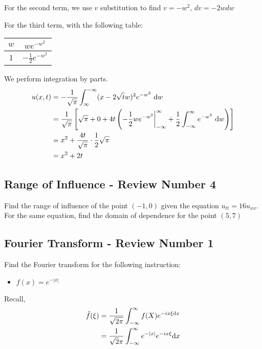 For the second term, we use $v$ substitution to find $v = -w^2$, $dv = -2w dw$

For the third term, with the following table:
%
\begin{center}
  \begin{tabular}{c|c}
    $w$ & $we^{-w^2}$\\
    \hline
    $1$ & $-\frac{1}{2} e^{-w^2}$
  \end{tabular}
\end{center}

We perform integration by parts.
%
\begin{align}
  u(x, t) & = - \frac{1}{\sqrt \pi} \int^{-\infty}_{\infty} (x - 2 \sqrt t w)^2 e^{-w^2}\ \text dw\\
  & = \frac{1}{\sqrt \pi}
  \left[
  \sqrt \pi
  + 0
  + 4t
  \left(
  -\frac{1}{2} we^{-w^2} \bigg|^\infty_{-\infty} + \frac{1}{2} \int^\infty_{-\infty} e^{-w^2}\ \text dw
  \right)
  \right]\\
  & = x^2 + \frac{4t}{\sqrt \pi} \cdot \frac{1}{2} \sqrt \pi\\
  & = x^2 + 2t
\end{align}

\subsection*{Range of Influence - Review Number 4}

Find the range of influence of the point $(-1, 0)$ given the equation $u_{tt} = 16u_{xx}$. For the same equation, find the domain of dependence for the point $(5, 7)$

\subsection*{Fourier Transform - Review Number 1}

Find the Fourier transform for the following instruction:
%
\begin{itemize}
  \item $f(x) = e^{-|x|}$
\end{itemize}

Recall,
%
\begin{align}
  \hat f(\xi) & = \frac{1}{\sqrt{2\pi}} \int^\infty_{-\infty} f(X) e^{-i x \xi \text dx}\\
  & = \frac{1}{\sqrt 2 \pi} \int^\infty_{-\infty} e^{-|x|} e^{-i x \xi} \text dx
\end{align}

